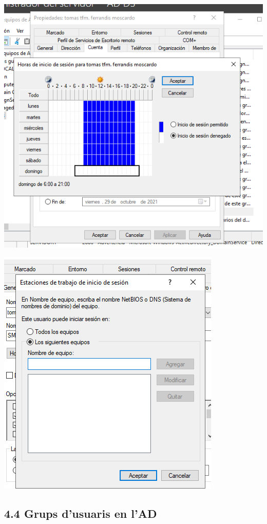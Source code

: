 \documentclass[
  a4paper,
]{article}
\begin{document}
\includegraphics{png/usuaris8.png}

\includegraphics{png/usuaris9.png}

\subsection{4.4 Grups d'usuaris en l'AD}\label{grups-dusuaris-en-lad}
\end{document}
